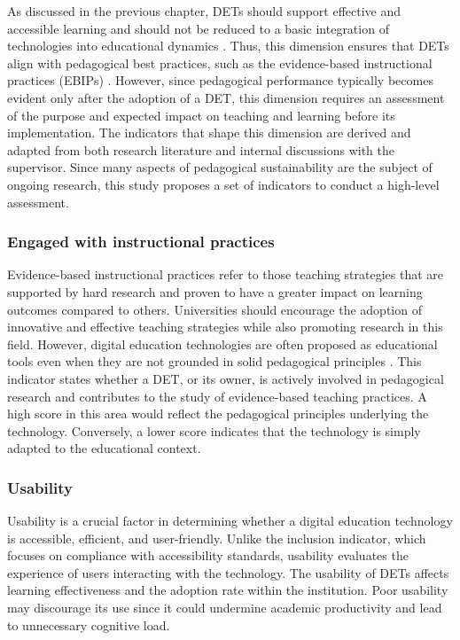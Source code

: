 As discussed in the previous chapter, DETs should support effective and accessible learning and should not be reduced to a basic integration of technologies into educational dynamics \cite{schuetze_digitalization_2024}\cite{teras_post-covid-19_2020}. Thus, this dimension ensures that DETs align with pedagogical best practices, such as the evidence-based instructional practices (EBIPs) \cite{lane_innovative_2020}. However, since pedagogical performance typically becomes evident only after the adoption of a DET, this dimension requires an assessment of the purpose and expected impact on teaching and learning before its implementation.
The indicators that shape this dimension are derived and adapted from both research literature and internal discussions with the supervisor. Since many aspects of pedagogical sustainability are the subject of ongoing research, this study proposes a set of indicators to conduct a high-level assessment. 

\subsubsection{Engaged with instructional practices}
Evidence-based instructional practices refer to those teaching strategies that are supported by hard research and proven to have a greater impact on learning outcomes compared to others. Universities should encourage the adoption of innovative and effective teaching strategies while also promoting research in this field. However, digital education technologies are often proposed as educational tools even when they are not grounded in solid pedagogical principles \cite{teras_post-covid-19_2020}. This indicator states whether a DET, or its owner, is actively involved in pedagogical research and contributes to the study of evidence-based teaching practices. A high score in this area would reflect the pedagogical principles underlying the technology. Conversely, a lower score indicates that the technology is simply adapted to the educational context.

\subsubsection{Usability}
Usability is a crucial factor in determining whether a digital education technology is accessible, efficient, and user-friendly. Unlike the inclusion indicator, which focuses on compliance with accessibility standards, usability evaluates the experience of users interacting with the technology. The usability of DETs affects learning effectiveness and the adoption rate within the institution. 
Poor usability may discourage its use since it could undermine academic productivity and lead to unnecessary cognitive load. 


